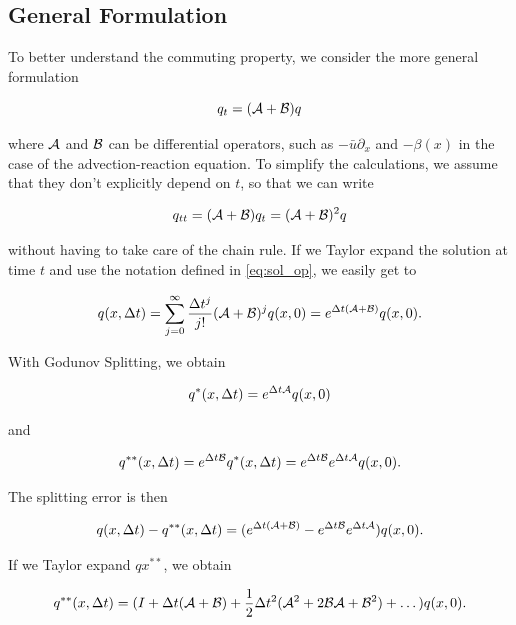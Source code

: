 \documentclass[journal,onecolumn]{IEEEtran}
\begin{document}

\subsection{General Formulation}

To better understand the commuting property, we consider the more general formulation

\begin{equation}
	q_t = (\mathcal{A}+\mathcal{B})q
\end{equation}

where $\mathcal{A}$ and $\mathcal{B}$ can be differential operators, such as $-\bar{u}\partial_x$ and $-\beta(x)$ in the case of the advection-reaction equation. To simplify the calculations, we assume that they don't explicitly depend on $t$, so that we can write

\begin{equation}
	q_{tt} = (\mathcal{A}+\mathcal{B})q_t=(\mathcal{A}+\mathcal{B})^2q
\end{equation}

without having to take care of the chain rule. If we Taylor expand the solution at time $t$ and use the notation defined in \eqref{eq:sol_op}, we easily get to

\begin{equation}\label{eq:exp_unsplit}
	q(x,\Delta t) = \sum_{j=0}^{\infty}\frac{\Delta t^j}{j!}(\mathcal{A} + \mathcal{B})^jq(x,0) = e^{\Delta t(\mathcal{A} +\mathcal{B})}q(x,0).
\end{equation}

With Godunov Splitting, we obtain

\begin{equation}
	q^*(x,\Delta t)=e^{\Delta t \mathcal{A}}q(x,0)
\end{equation}

and

\begin{equation}
	q^{**}(x,\Delta t)=e^{\Delta t \mathcal{B}}q^*(x,\Delta t) = e^{\Delta t \mathcal{B}}e^{\Delta t \mathcal{A}}q(x,0).
\end{equation}

The splitting error is then

\begin{equation}
	q(x,\Delta t)-q^{**}(x,\Delta t) = (e^{\Delta t(\mathcal{A} +\mathcal{B})}-e^{\Delta t \mathcal{B}}e^{\Delta t \mathcal{A}})q(x,0).
\end{equation}

If we Taylor expand $qx^{**}$, we obtain

\begin{equation}\label{eq:exp_split}
	q^{**}(x,\Delta t) = (I+\Delta t(\mathcal{A} + \mathcal{B})+\frac{1}{2}\Delta t^2(\mathcal{A}^2+2\mathcal{B}\mathcal{A}+\mathcal{B}^2)+\dots)q(x,0).
\end{equation}
\end{document}
